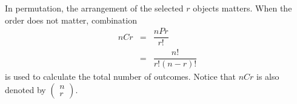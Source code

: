 In permutation, the arrangement of the selected $r$ objects matters. When the order does not matter, combination
\begin{eqnarray}
  nCr &=& \dfrac{nPr}{r!} \nonumber \\ 
  &=& \dfrac{n!}{r!(n-r)!} \nonumber
\end{eqnarray}
is used to calculate the total number of outcomes. Notice that $nCr$ is also denoted by $\left(\begin{array}{c}
                                                                                           n \\
                                                                                           r
                                                                                         \end{array}\right)$.
